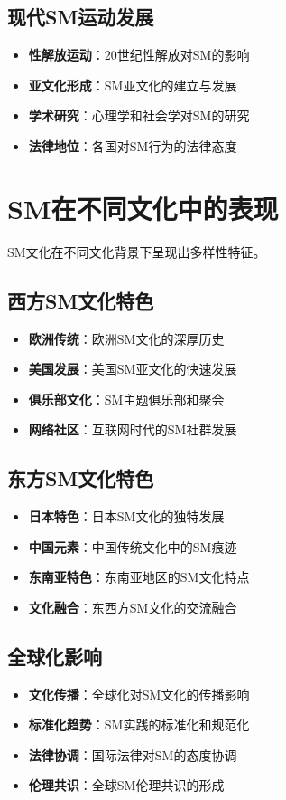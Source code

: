 \documentclass[12pt,UTF8]{ctexbook}
\begin{document}
\subsection{现代SM运动发展}
\begin{itemize}[leftmargin=2cm]
	\item \textbf{性解放运动}：20世纪性解放对SM的影响
	\item \textbf{亚文化形成}：SM亚文化的建立与发展
	\item \textbf{学术研究}：心理学和社会学对SM的研究
	\item \textbf{法律地位}：各国对SM行为的法律态度
\end{itemize}

\section{SM在不同文化中的表现}
SM文化在不同文化背景下呈现出多样性特征。

\subsection{西方SM文化特色}
\begin{itemize}[leftmargin=2cm]
	\item \textbf{欧洲传统}：欧洲SM文化的深厚历史
	\item \textbf{美国发展}：美国SM亚文化的快速发展
	\item \textbf{俱乐部文化}：SM主题俱乐部和聚会
	\item \textbf{网络社区}：互联网时代的SM社群发展
\end{itemize}

\subsection{东方SM文化特色}
\begin{itemize}[leftmargin=2cm]
	\item \textbf{日本特色}：日本SM文化的独特发展
	\item \textbf{中国元素}：中国传统文化中的SM痕迹
	\item \textbf{东南亚特色}：东南亚地区的SM文化特点
	\item \textbf{文化融合}：东西方SM文化的交流融合
\end{itemize}

\subsection{全球化影响}
\begin{itemize}[leftmargin=2cm]
	\item \textbf{文化传播}：全球化对SM文化的传播影响
	\item \textbf{标准化趋势}：SM实践的标准化和规范化
	\item \textbf{法律协调}：国际法律对SM的态度协调
	\item \textbf{伦理共识}：全球SM伦理共识的形成
\end{itemize}
\end{document}
